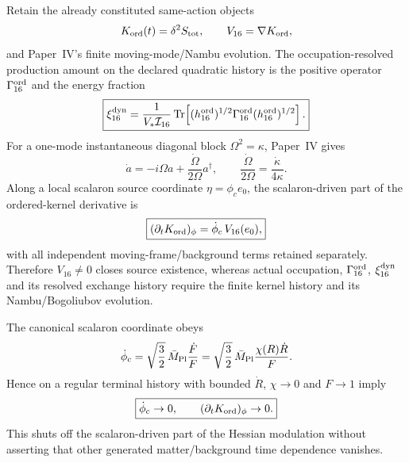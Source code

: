 \documentclass[12pt,a4paper]{article}
\begin{document}
\begin{theorem}
\label{p8:thm:v2178-k16-finite-production-owner}
Retain the already constituted same-action objects
\[
 K_{\rm ord}(t)=\delta^2S_{\rm tot},\qquad
 V_{16}=\nabla K_{\rm ord},
\]
and Paper~IV's finite moving-mode/Nambu evolution.  The occupation-resolved production
amount on the declared quadratic history is the positive operator $\Gamma_{16}^{\rm ord}$ and the energy fraction
\[
 \boxed{\xi_{16}^{\rm dyn}=
 \frac{1}{V_*\mathcal I_{16}}
 \operatorname{Tr}\!\left[
 (h_{16}^{\rm ord})^{1/2}\Gamma_{16}^{\rm ord}
 (h_{16}^{\rm ord})^{1/2}\right].}
\]
For a one-mode instantaneous diagonal block $\Omega^2=\kappa$, Paper~IV gives
\[
 \dot a=-i\Omega a+\frac{\dot\Omega}{2\Omega}a^\dagger,
 \qquad
 \frac{\dot\Omega}{2\Omega}=\frac{\dot\kappa}{4\kappa}.
\]
Along a local scalaron source coordinate $\eta=\phi_c e_0$, the scalaron-driven
part of the ordered-kernel derivative is
\[
 \boxed{(\partial_tK_{\rm ord})_{\phi}
 =\dot\phi_c\,V_{16}(e_0),}
\]
with all independent moving-frame/background terms retained separately.
Therefore $V_{16}\neq0$ closes source existence, whereas actual occupation,
$\Gamma_{16}^{\rm ord}$, $\xi_{16}^{\rm dyn}$ and its resolved exchange history require
the finite kernel history and its Nambu/Bogoliubov evolution.
\end{theorem}

\begin{corollary}
\label{p8:cor:v2178-scalaron-modulation-shutoff}
The canonical scalaron coordinate obeys
\[
 \dot\phi_c=\sqrt{\frac32}\,\bar M_{\rm Pl}\frac{\dot F}{F}
 =\sqrt{\frac32}\,\bar M_{\rm Pl}\frac{\chi(R)\dot R}{F}.
\]
Hence on a regular terminal history with bounded $\dot R$,
$\chi\to0$ and $F\to1$ imply
\[
 \boxed{\dot\phi_c\to0,\qquad
 (\partial_tK_{\rm ord})_{\phi}\to0.}
\]
This shuts off the scalaron-driven part of the Hessian modulation without
asserting that other generated matter/background time dependence vanishes.
\end{corollary}
\end{document}
